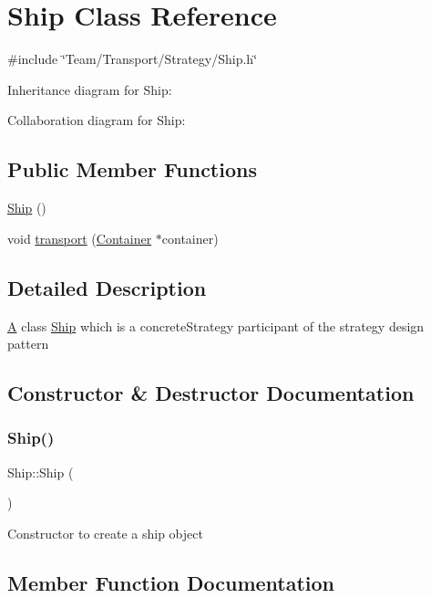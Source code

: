 \hypertarget{classShip}{}\section{Ship Class Reference}
\label{classShip}


{\ttfamily \#include \char`\"{}Team/\+Transport/\+Strategy/\+Ship.\+h\char`\"{}}



Inheritance diagram for Ship\+:


Collaboration diagram for Ship\+:
\subsection*{Public Member Functions}
\begin{DoxyCompactItemize}
\item 
\hyperlink{classShip_ab7608fcfc4d27c678aacaf9bfd68a462}{Ship} ()
\item 
void \hyperlink{classShip_a8b60ca34490dd8ef1c93888fa61c9472}{transport} (\hyperlink{classContainer}{Container} $\ast$container)
\end{DoxyCompactItemize}


\subsection{Detailed Description}
\hyperlink{classA}{A} class \hyperlink{classShip}{Ship} which is a concrete\+Strategy participant of the strategy design pattern 

\subsection{Constructor \& Destructor Documentation}
\mbox{\label{classShip_ab7608fcfc4d27c678aacaf9bfd68a462}} 
\subsubsection{\texorpdfstring{Ship()}{Ship()}}
{\footnotesize\ttfamily Ship\+::\+Ship (\begin{DoxyParamCaption}{ }\end{DoxyParamCaption})}

Constructor to create a ship object 

\subsection{Member Function Documentation}
\mbox{\label{classShip_a8b60ca34490dd8ef1c93888fa61c9472}} 
